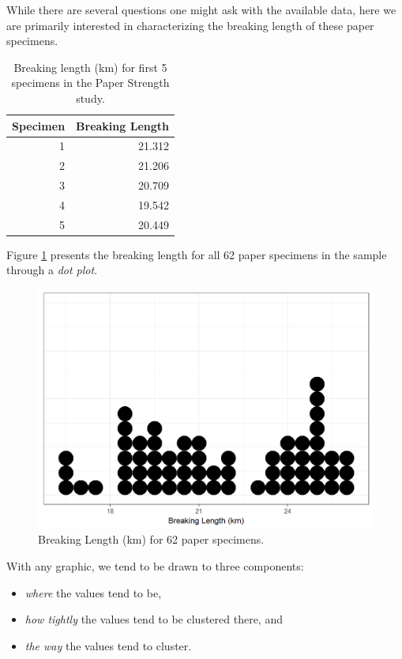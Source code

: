 \documentclass[]{book}
\providecommand{\tightlist}{%
  \setlength{\itemsep}{0pt}\setlength{\parskip}{0pt}}
\theoremstyle{definition}
\theoremstyle{definition}
\theoremstyle{remark}
\begin{document}
While there are several questions one might ask with the available data,
here we are primarily interested in characterizing the breaking length
of these paper specimens.

\begin{table}

\caption{\label{tab:summaries-paper-table}Breaking length (km) for first 5 specimens in the Paper Strength study.}
\centering
\begin{tabular}[t]{r|r}
\hline
Specimen & Breaking Length\\
\hline
1 & 21.312\\
\hline
2 & 21.206\\
\hline
3 & 20.709\\
\hline
4 & 19.542\\
\hline
5 & 20.449\\
\hline
\end{tabular}
\end{table}

Figure \ref{fig:summaries-paper-dotplot} presents the breaking length
for all 62 paper specimens in the sample through a \emph{dot plot}.

\begin{figure}

{\centering \includegraphics[width=0.8\linewidth]{./Images/summaries-paper-dotplot-1} 

}

\caption{Breaking Length (km) for 62 paper specimens.}\label{fig:summaries-paper-dotplot}
\end{figure}

With any graphic, we tend to be drawn to three components:

\begin{itemize}
\tightlist
\item
  \emph{where} the values tend to be,
\item
  \emph{how tightly} the values tend to be clustered there, and
\item
  \emph{the way} the values tend to cluster.
\end{itemize}
\end{document}

